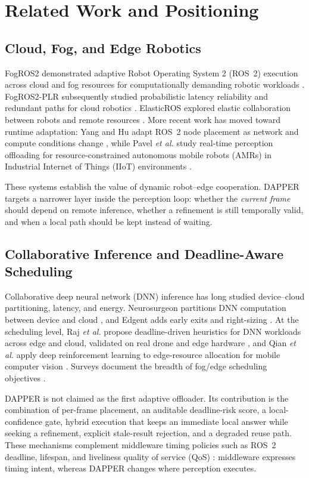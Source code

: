 \documentclass[conference,a4paper]{IEEEtran}
\newcommand{\etal}{\emph{et al.}}
\begin{document}
\section{Related Work and Positioning}
\subsection{Cloud, Fog, and Edge Robotics}
FogROS2 demonstrated adaptive Robot Operating System 2 (ROS~2) execution across cloud and fog resources for computationally demanding robotic workloads \cite{fogros2}. FogROS2-PLR subsequently studied probabilistic latency reliability and redundant paths for cloud robotics \cite{fogros2plr}. ElasticROS explored elastic collaboration between robots and remote resources \cite{elasticros}. More recent work has moved toward runtime adaptation: Yang and Hu adapt ROS~2 node placement as network and compute conditions change \cite{yang2025}, while Pavel \etal{} study real-time perception offloading for resource-constrained autonomous mobile robots (AMRs) in Industrial Internet of Things (IIoT) environments \cite{pavel2026}.

These systems establish the value of dynamic robot--edge cooperation. DAPPER targets a narrower layer inside the perception loop: whether the \emph{current frame} should depend on remote inference, whether a refinement is still temporally valid, and when a local path should be kept instead of waiting.

\subsection{Collaborative Inference and Deadline-Aware Scheduling}
Collaborative deep neural network (DNN) inference has long studied device--cloud partitioning, latency, and energy. Neurosurgeon partitions DNN computation between device and cloud \cite{neurosurgeon}, and Edgent adds early exits and right-sizing \cite{edgent}. At the scheduling level, Raj \etal{} propose deadline-driven heuristics for DNN workloads across edge and cloud, validated on real drone and edge hardware \cite{raj2025}, and Qian \etal{} apply deep reinforcement learning to edge-resource allocation for mobile computer vision \cite{qian2026}. Surveys document the breadth of fog/edge scheduling objectives \cite{goudarzi2023,iftikhar2023}.

DAPPER is not claimed as the first adaptive offloader. Its contribution is the combination of per-frame placement, an auditable deadline-risk score, a local-confidence gate, hybrid execution that keeps an immediate local answer while seeking a refinement, explicit stale-result rejection, and a degraded reuse path. These mechanisms complement middleware timing policies such as ROS~2 deadline, lifespan, and liveliness quality of service (QoS) \cite{ros2qos}: middleware expresses timing intent, whereas DAPPER changes where perception executes.
\end{document}
